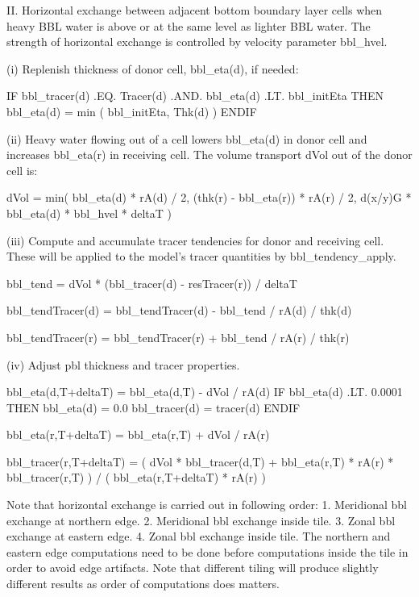 II. Horizontal exchange between adjacent bottom boundary layer cells when
heavy BBL water is above or at the same level as lighter BBL water.  The
strength of horizontal exchange is controlled by velocity parameter bbl_hvel.

(i) Replenish thickness of donor cell, bbl_eta(d), if needed:

    IF bbl_tracer(d) .EQ. Tracer(d) .AND. bbl_eta(d) .LT. bbl_initEta THEN
       bbl_eta(d) = min ( bbl_initEta, Thk(d) )
    ENDIF

(ii) Heavy water flowing out of a cell lowers bbl_eta(d) in donor cell and
increases bbl_eta(r) in receiving cell.  The volume transport dVol out
of the donor cell is:

    dVol = min( bbl_eta(d) * rA(d) / 2,
                (thk(r) - bbl_eta(r)) * rA(r) / 2,
                d(x/y)G * bbl_eta(d) * bbl_hvel * deltaT )

(iii) Compute and accumulate tracer tendencies for donor and receiving cell.
These will be applied to the model's tracer quantities by bbl_tendency_apply.

    bbl_tend = dVol * (bbl_tracer(d) - resTracer(r)) / deltaT

    bbl_tendTracer(d) = bbl_tendTracer(d) - bbl_tend / rA(d) / thk(d)

    bbl_tendTracer(r) = bbl_tendTracer(r) + bbl_tend / rA(r) / thk(r)

(iv) Adjust pbl thickness and tracer properties.
                        
    bbl_eta(d,T+deltaT) = bbl_eta(d,T) - dVol / rA(d)
    IF bbl_eta(d) .LT. 0.0001 THEN
       bbl_eta(d) = 0.0
       bbl_tracer(d) = tracer(d)
    ENDIF

    bbl_eta(r,T+deltaT) = bbl_eta(r,T) + dVol / rA(r)

    bbl_tracer(r,T+deltaT) = ( dVol * bbl_tracer(d,T) +
                              bbl_eta(r,T) * rA(r) * bbl_tracer(r,T) ) /
                            ( bbl_eta(r,T+deltaT) * rA(r) )

Note that horizontal exchange is carried out in following order:
1. Meridional bbl exchange at northern edge.
2. Meridional bbl exchange inside tile.
3. Zonal bbl exchange at eastern edge.
4. Zonal bbl exchange inside tile.
The northern and eastern edge computations need to be done before
computations inside the tile in order to avoid edge artifacts.
Note that different tiling will produce slightly different results
as order of computations does matters.
